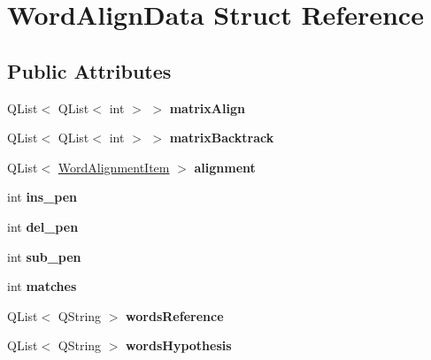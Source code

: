 \hypertarget{struct_word_align_data}{}\section{Word\+Align\+Data Struct Reference}
\label{struct_word_align_data}
\subsection*{Public Attributes}
\begin{DoxyCompactItemize}
\item 
\mbox{\label{struct_word_align_data_a70e19b5f0c728a89788be8738f893303}} 
Q\+List$<$ Q\+List$<$ int $>$ $>$ {\bfseries matrix\+Align}
\item 
\mbox{\label{struct_word_align_data_a0e5fc7b8beb92322f11ebec14d45216d}} 
Q\+List$<$ Q\+List$<$ int $>$ $>$ {\bfseries matrix\+Backtrack}
\item 
\mbox{\label{struct_word_align_data_aefe57ae921939f820eb2545257a1f046}} 
Q\+List$<$ \hyperlink{struct_word_alignment_item}{Word\+Alignment\+Item} $>$ {\bfseries alignment}
\item 
\mbox{\label{struct_word_align_data_af7fa902dbdc6d40b58311e6fb474640c}} 
int {\bfseries ins\+\_\+pen}
\item 
\mbox{\label{struct_word_align_data_aa1acc67be411b03af991e3d2d900b374}} 
int {\bfseries del\+\_\+pen}
\item 
\mbox{\label{struct_word_align_data_a5779dfa5822ba9f5aac14ed5475b8543}} 
int {\bfseries sub\+\_\+pen}
\item 
\mbox{\label{struct_word_align_data_a4cb8426daa0f46d83b83376b4c62bccb}} 
int {\bfseries matches}
\item 
\mbox{\label{struct_word_align_data_a7f18a70df164d3b32d898e782265a547}} 
Q\+List$<$ Q\+String $>$ {\bfseries words\+Reference}
\item 
\mbox{\label{struct_word_align_data_ad5cd53031bbdc3f06939e07593717392}} 
Q\+List$<$ Q\+String $>$ {\bfseries words\+Hypothesis}
\end{DoxyCompactItemize}
